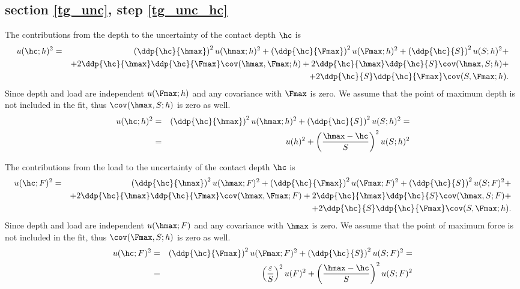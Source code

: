   \subsection{section \ref{tg_unc}, step \ref{tg_unc_hc}}
  The contributions from the depth to the uncertainty of the contact depth $\hc$ is 
  \begin{eqnarray*}
 u(\hc;h)^2 &=& 
 \left( \ddp{\hc}{\hmax}\right)^2 u(\hmax;h)^2 + 
 \left( \ddp{\hc}{\Fmax}\right)^2 u(\Fmax;h)^2 + 
 \left( \ddp{\hc}{S}\right)^2 u(S;h)^2 + \\
 &&+
 2 \ddp{\hc}{\hmax} \ddp{\hc}{\Fmax} \cov(\hmax, \Fmax;h)+
 2 \ddp{\hc}{\hmax} \ddp{\hc}{S} \cov(\hmax, S;h)+ \\
 &&+
 2 \ddp{\hc}{S} \ddp{\hc}{\Fmax} \cov(S, \Fmax;h).
 \end{eqnarray*}
Since depth and load are independent $u(\Fmax;h)$ and any covariance with $\Fmax$ is zero. 
We assume that the point of maximum depth is not included in the fit, thus $\cov(\hmax,S;h)$ is zero as well.
\begin{eqnarray*}
 u(\hc;h)^2 &=& 
  \left( \ddp{\hc}{\hmax}\right)^2 u(\hmax;h)^2 + 
  \left( \ddp{\hc}{S}\right)^2 u(S;h)^2 = \\
 &=& u(h)^2 + \left( \frac{\hmax - \hc}{S}\right)^2 u(S;h)^2
\end{eqnarray*}

The contributions from the load to the uncertainty of the contact depth $\hc$ is 
  \begin{eqnarray*}
 u(\hc;F)^2 &=& 
 \left( \ddp{\hc}{\hmax}\right)^2 u(\hmax;F)^2 + 
 \left( \ddp{\hc}{\Fmax}\right)^2 u(\Fmax;F)^2 + 
 \left( \ddp{\hc}{S}\right)^2 u(S;F)^2 + \\
 &&+
 2 \ddp{\hc}{\hmax} \ddp{\hc}{\Fmax} \cov(\hmax, \Fmax;F)+
 2 \ddp{\hc}{\hmax} \ddp{\hc}{S} \cov(\hmax, S;F)+ \\
 &&+
 2 \ddp{\hc}{S} \ddp{\hc}{\Fmax} \cov(S, \Fmax;h).
 \end{eqnarray*}
Since depth and load are independent $u(\hmax;F)$ and any covariance with $\hmax$ is zero. 
We assume that the point of maximum force is not included in the fit, thus $\cov(\Fmax,S;h)$ is zero as well.
\begin{eqnarray*}
 u(\hc;F)^2 &=& 
  \left( \ddp{\hc}{\Fmax}\right)^2 u(\Fmax;F)^2 + 
  \left( \ddp{\hc}{S}\right)^2 u(S;F)^2 = \\
 &=& \left( \frac{\varepsilon}{S}\right)^2 u(F)^2 + \left( \frac{\hmax - \hc}{S}\right)^2 u(S;F)^2
\end{eqnarray*}

